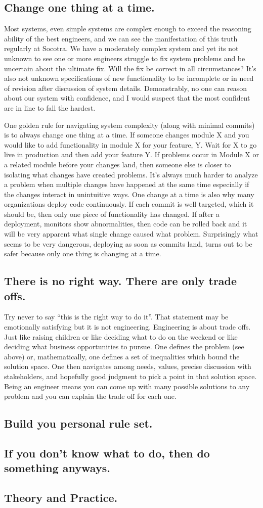 \subsection{Change one thing at a time.}
Most systems, even simple systems are complex enough to exceed the reasoning ability of the best engineers, and we can see the manifestation of this truth regularly at
Socotra. We have a moderately complex system and yet its not unknown to see one or more engineers struggle to fix system problems and
be uncertain about the ultimate fix. Will the fix be correct in all circumstances? It's also not unknown specifications of new functionality
to be incomplete or in need of revision after discussion of system details. Demonstrably, no one can reason about our system with confidence, and
I would suspect that the most confident are in line to fall the hardest.

One golden rule for navigating system complexity (along with minimal commits) is to always change one thing at a time. If someone changes module
X and you would like to add functionality in module X for your feature, Y. Wait for X to go live in production and then add your feature Y. If
problems occur in Module X or a related module before your changes land, then someone else is closer to isolating what changes have created problems.
It's always much harder to analyze a problem when multiple changes have happened at the same time especially if the changes interact in
unintuitive ways. One change at a time is also why many organizations deploy code continuously. If each commit is well targeted, which it should
be, then only one piece of functionality has changed. If after a deployment, monitors show abnormalities, then code can be rolled back and it will
be very apparent what single change caused what problem. Surprisingly what seems to be very dangerous, deploying as soon as commits land, turns
out to be safer because only one thing is changing at a time.

\subsection{There is no right way. There are only trade offs.}
Try never to say ``this is the right way to do it''. That statement may be emotionally satisfying but it is not engineering. Engineering
is about trade offs. Just like raising children or like deciding what to do on the weekend or like deciding what business opportunities to pursue.
One defines the problem (see above) or, mathematically, one defines a set of inequalities which bound the solution space. One then navigates among needs,
values, precise discussion with stakeholders, and hopefully good judgment to pick a point in that solution space. Being an engineer means you
can come up with many possible solutions to any problem and you can explain the trade off for each one.

\subsection{Build you personal rule set.}

\subsection{If you don't know what to do, then do something anyways.}

\subsection{Theory and Practice.}
